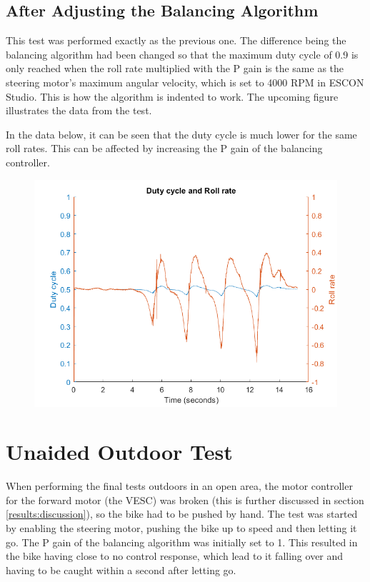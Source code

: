 \newpage

\subsection{After Adjusting the Balancing Algorithm}

This test was performed exactly as the previous one. The difference being the balancing algorithm had been changed so that the maximum duty cycle of 0.9 is only reached when the roll rate multiplied with the P gain is the same as the steering motor's maximum angular velocity, which is set to 4000 RPM in ESCON Studio. This is how the algorithm is indented to work. The upcoming figure illustrates the data from the test.

In the data below, it can be seen that the duty cycle is much lower for the same roll rates. This can be affected by increasing the P gain of the balancing controller.

\begin{figure}[h]
    \centering
    \includegraphics[width=\textwidth]{figure/pwmVsRollRateCorrected.png}
\end{figure}

\newpage

\section{Unaided Outdoor Test}

When performing the final tests outdoors in an open area, the motor controller for the forward motor (the VESC) was broken (this is further discussed in section \ref{results:discussion}), so the bike had to be pushed by hand. The test was started by enabling the steering motor, pushing the bike up to speed and then letting it go. The P gain of the balancing algorithm was initially set to 1. This resulted in the bike having close to no control response, which lead to it falling over and having to be caught within a second after letting go.

